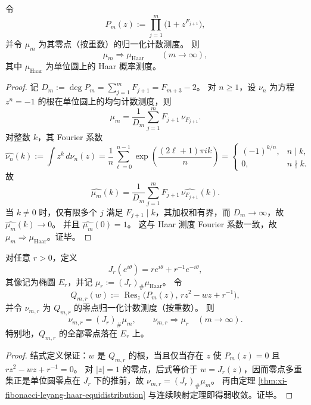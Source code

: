 \begin{theorem}\label{thm:xi-fibonacci-leyang-haar-equidistribution}
令
\[
P_m(z):=\prod_{j=1}^{m}\bigl(1+z^{F_{j+1}}\bigr),
\]
并令 \(\mu_m\) 为其零点（按重数）的归一化计数测度。
则
\[
\mu_m\Rightarrow \mu_{\mathrm{Haar}}
\qquad (m\to\infty),
\]
其中 \(\mu_{\mathrm{Haar}}\) 为单位圆上的 Haar 概率测度。
\end{theorem}
\begin{proof}
记
\(
D_m:=\deg P_m=\sum_{j=1}^{m}F_{j+1}=F_{m+3}-2
\)。
对 \(n\ge 1\)，设 \(\nu_n\) 为方程 \(z^n=-1\) 的根在单位圆上的均匀计数测度，则
\[
\mu_m=\frac{1}{D_m}\sum_{j=1}^{m}F_{j+1}\,\nu_{F_{j+1}}.
\]
对整数 \(k\)，其 Fourier 系数
\[
\widehat{\nu_n}(k)
:=\int z^k\,d\nu_n(z)
=\frac1n\sum_{\ell=0}^{n-1}
\exp\!\left(\frac{(2\ell+1)\pi i k}{n}\right)
=
\begin{cases}
(-1)^{k/n}, & n\mid k,\\
0, & n\nmid k.
\end{cases}
\]
故
\[
\widehat{\mu_m}(k)
=\frac{1}{D_m}\sum_{j=1}^{m}F_{j+1}\,\widehat{\nu_{F_{j+1}}}(k).
\]
当 \(k\neq 0\) 时，仅有限多个 \(j\) 满足 \(F_{j+1}\mid k\)，其加权和有界，而 \(D_m\to\infty\)，故
\(
\widehat{\mu_m}(k)\to 0
\)。
并且 \(\widehat{\mu_m}(0)=1\)。
这与 Haar 测度 Fourier 系数一致，故 \(\mu_m\Rightarrow\mu_{\mathrm{Haar}}\)。证毕。
\end{proof}

\begin{corollary}\label{cor:xi-joukowsky-godel-ellipse-transport-equidistribution}
对任意 \(r>0\)，定义
\[
J_r(e^{i\theta})=re^{i\theta}+r^{-1}e^{-i\theta},
\]
其像记为椭圆 \(E_r\)，并记
\(
\mu_r:=(J_r)_{\#}\mu_{\mathrm{Haar}}
\)。
令
\[
Q_{m,r}(w):=
\operatorname{Res}_z\!\bigl(P_m(z),\,rz^2-wz+r^{-1}\bigr),
\]
并令 \(\nu_{m,r}\) 为 \(Q_{m,r}\) 的零点归一化计数测度（按重数）。
则
\[
\nu_{m,r}=(J_r)_{\#}\mu_m,
\qquad
\nu_{m,r}\Rightarrow \mu_r\quad(m\to\infty).
\]
特别地，\(Q_{m,r}\) 的全部零点落在 \(E_r\) 上。
\end{corollary}
\begin{proof}
结式定义保证：\(w\) 是 \(Q_{m,r}\) 的根，当且仅当存在 \(z\) 使
\(
P_m(z)=0
\)
且
\(
rz^2-wz+r^{-1}=0
\)。
对 \(|z|=1\) 的零点，后式等价于 \(w=J_r(z)\)，因而零点多重集正是单位圆零点在 \(J_r\) 下的推前，故 \(\nu_{m,r}=(J_r)_{\#}\mu_m\)。
再由定理 \ref{thm:xi-fibonacci-leyang-haar-equidistribution} 与连续映射定理即得弱收敛。证毕。
\end{proof}

